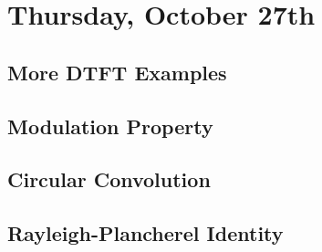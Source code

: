 \section{Thursday, October 27th}
\subsection{More DTFT Examples}
\subsection{Modulation Property}
\subsection{Circular Convolution}
\subsection{Rayleigh-Plancherel Identity}



